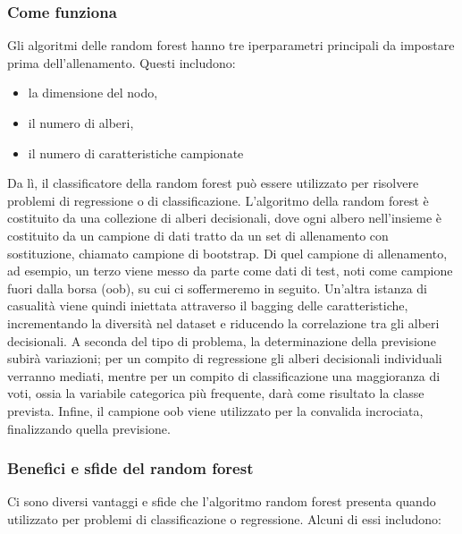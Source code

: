 \subsubsection{Come funziona}
Gli algoritmi delle random forest hanno tre iperparametri principali da impostare prima dell'allenamento. 
Questi includono: 

\begin{itemize}
  \item la dimensione del nodo, 
  \item il numero di alberi, 
  \item il numero di caratteristiche campionate
\end{itemize}

Da lì, il classificatore della random forest può essere utilizzato per risolvere problemi di regressione o di classificazione.
L'algoritmo della random forest è costituito da una collezione di alberi decisionali, dove ogni albero nell'insieme è costituito da un campione di dati tratto da un set di allenamento con sostituzione, chiamato campione di bootstrap. 
Di quel campione di allenamento, ad esempio, un terzo viene messo da parte come dati di test, noti come campione fuori dalla borsa (oob), su cui ci soffermeremo in seguito. 
Un'altra istanza di casualità viene quindi iniettata attraverso il bagging delle caratteristiche, incrementando la diversità nel dataset e riducendo la correlazione tra gli alberi decisionali. 
A seconda del tipo di problema, la determinazione della previsione subirà variazioni; per un compito di regressione gli alberi decisionali individuali verranno mediati, mentre per un compito di classificazione una maggioranza di voti, ossia la variabile categorica più frequente, darà come risultato la classe prevista. 
Infine, il campione oob viene utilizzato per la convalida incrociata, finalizzando quella previsione.

\subsubsection{Benefici e sfide del random forest}
Ci sono diversi vantaggi e sfide che l'algoritmo random forest presenta quando utilizzato per problemi di classificazione o regressione. Alcuni di essi includono:

